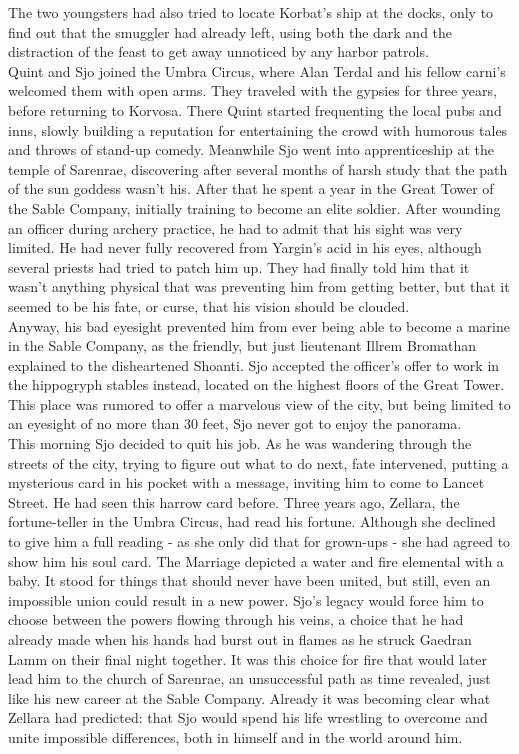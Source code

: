 The two youngsters had also tried to locate Korbat's ship at the docks, only to find out that the smuggler had already left, using both the dark and the distraction of the feast to get away unnoticed by any harbor patrols.\\

Quint and Sjo joined the Umbra Circus, where Alan Terdal and his fellow carni's welcomed them with open arms. They traveled with the gypsies for three years, before returning to Korvosa. There Quint started frequenting the local pubs and inns, slowly building a reputation for entertaining the crowd with humorous tales and throws of stand-up comedy. Meanwhile Sjo went into apprenticeship at the temple of Sarenrae, discovering after several months of harsh study that the path of the sun goddess wasn't his. After that he spent a year in the Great Tower of the Sable Company, initially training to become an elite soldier. After wounding an officer during archery practice, he had to admit that his sight was very limited. He had never fully recovered from Yargin's acid in his eyes, although several priests had tried to patch him up. They had finally told him that it wasn't anything physical that was preventing him from getting better, but that it seemed to be his fate, or curse, that his vision should be clouded.\\

Anyway, his bad eyesight prevented him from ever being able to become a marine in the Sable Company, as the friendly, but just lieutenant Illrem Bromathan explained to the disheartened Shoanti. Sjo accepted the officer's offer to work in the hippogryph stables instead, located on the highest floors of the Great Tower. This place was rumored to offer a marvelous view of the city, but being limited to an eyesight of no more than 30 feet, Sjo never got to enjoy the panorama.\\

This morning Sjo decided to quit his job. As he was wandering through the streets of the city, trying to figure out what to do next, fate intervened, putting a mysterious card in his pocket with a message, inviting him to come to Lancet Street. He had seen this harrow card before. Three years ago, Zellara, the fortune-teller in the Umbra Circus, had read his fortune. Although she declined to give him a full reading - as she only did that for grown-ups - she had agreed to show him his soul card. The Marriage depicted a water and fire elemental with a baby. It stood for things that should never have been united, but still, even an impossible union could result in a new power. Sjo's legacy would force him to choose between the powers flowing through his veins, a choice that he had already made when his hands had burst out in flames as he struck Gaedran Lamm on their final night together. It was this choice for fire that would later lead him to the church of Sarenrae, an unsuccessful path as time revealed, just like his new career at the Sable Company. Already it was becoming clear what Zellara had predicted: that Sjo would spend his life wrestling to overcome and unite impossible differences, both in himself and in the world around him.\\

